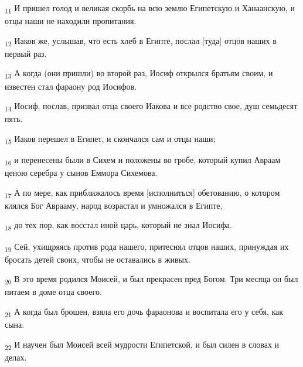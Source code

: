 \begin{tcolorbox}
\textsubscript{11} И пришел голод и великая скорбь на всю землю Египетскую и Ханаанскую, и отцы наши не находили пропитания.
\end{tcolorbox}
\begin{tcolorbox}
\textsubscript{12} Иаков же, услышав, что есть хлеб в Египте, послал [туда] отцов наших в первый раз.
\end{tcolorbox}
\begin{tcolorbox}
\textsubscript{13} А когда (они пришли) во второй раз, Иосиф открылся братьям своим, и известен стал фараону род Иосифов.
\end{tcolorbox}
\begin{tcolorbox}
\textsubscript{14} Иосиф, послав, призвал отца своего Иакова и все родство свое, душ семьдесят пять.
\end{tcolorbox}
\begin{tcolorbox}
\textsubscript{15} Иаков перешел в Египет, и скончался сам и отцы наши;
\end{tcolorbox}
\begin{tcolorbox}
\textsubscript{16} и перенесены были в Сихем и положены во гробе, который купил Авраам ценою серебра у сынов Еммора Сихемова.
\end{tcolorbox}
\begin{tcolorbox}
\textsubscript{17} А по мере, как приближалось время [исполниться] обетованию, о котором клялся Бог Аврааму, народ возрастал и умножался в Египте,
\end{tcolorbox}
\begin{tcolorbox}
\textsubscript{18} до тех пор, как восстал иной царь, который не знал Иосифа.
\end{tcolorbox}
\begin{tcolorbox}
\textsubscript{19} Сей, ухищряясь против рода нашего, притеснял отцов наших, принуждая их бросать детей своих, чтобы не оставались в живых.
\end{tcolorbox}
\begin{tcolorbox}
\textsubscript{20} В это время родился Моисей, и был прекрасен пред Богом. Три месяца он был питаем в доме отца своего.
\end{tcolorbox}
\begin{tcolorbox}
\textsubscript{21} А когда был брошен, взяла его дочь фараонова и воспитала его у себя, как сына.
\end{tcolorbox}
\begin{tcolorbox}
\textsubscript{22} И научен был Моисей всей мудрости Египетской, и был силен в словах и делах.
\end{tcolorbox}
